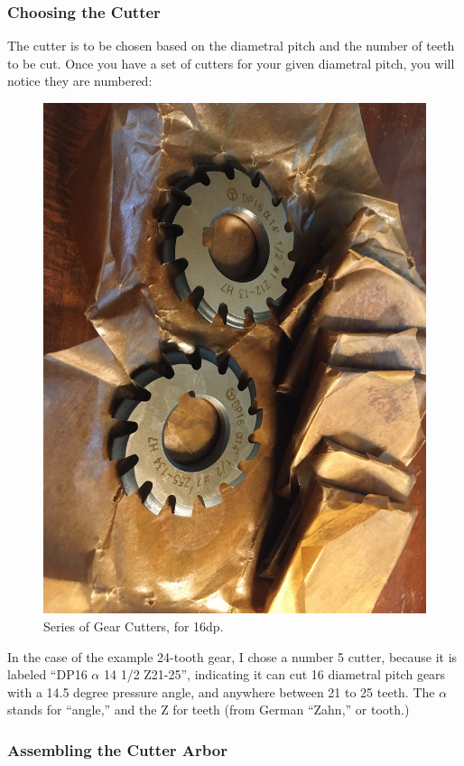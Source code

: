 \documentclass[12pt,twoside,letterpaper]{article}
\begin{document}
\clearpage
\subsubsection{Choosing the Cutter}
The cutter is to be chosen based on the diametral pitch and the number of teeth to be cut. Once you have a set of cutters for your given diametral pitch, you will notice they are numbered:

\begin{figure}[H]
\centering
\includegraphics[width=5in]{cutter2}
	\caption{Series of Gear Cutters, for 16dp.}
\end{figure}

In the case of the example 24-tooth gear, I chose a number 5 cutter, because it is labeled ``DP16 $\alpha$ 14 1/2 Z21-25'', indicating it can cut 16 diametral pitch gears with a 14.5 degree pressure angle, and anywhere between 21 to 25 teeth. The $\alpha$ stands for ``angle,'' and the Z for teeth (from German ``Zahn,'' or tooth.)

\clearpage
\subsubsection{Assembling the Cutter Arbor}
\end{document}

